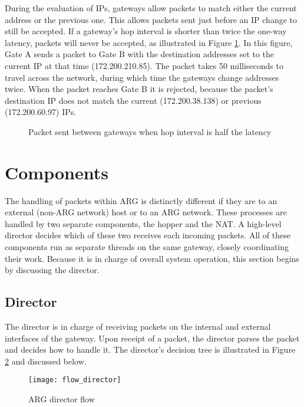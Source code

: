 \par During the evaluation of \acp{IP}, gateways allow packets to match either the current address or the previous one. This allows packets sent just before an \ac{IP} change to still be accepted. If a gateway's hop interval is shorter than twice the one-way latency, packets will never be accepted, as illustrated in Figure \ref{fig:late_packet_example}. In this figure, Gate A sends a packet to Gate B with the destination addresses set to the current \ac{IP} at that time (172.200.210.85). The packet takes 50 milliseconds to travel across the network, during which time the gateways change addresses twice. When the packet reaches Gate B it is rejected, because the packet's destination \ac{IP} does not match the current (172.200.38.138) or previous (172.200.60.97) \acp{IP}.

\begin{figure}
\caption{Packet sent between gateways when hop interval is half the latency}
\label{fig:late_packet_example}
\centering
\noindent{}
\end{figure}

\section{Components}
\label{sec:arg_components}
The handling of packets within ARG is distinctly different if they are to an external (non-ARG network) host or to an ARG network. These processes are handled by two separate components, the hopper and the NAT. A high-level director decides which of these two receives each incoming packets. All of these components run as separate threads on the same gateway, closely coordinating their work. Because it is in charge of overall system operation, this section begins by discussing the director.

\subsection{Director}
\label{sec:arg_director}
\par The director is in charge of receiving packets on the internal and external interfaces of the gateway. Upon receipt of a packet, the director parses the packet and decides how to handle it. The director's decision tree is illustrated in Figure \ref{fig:arg_director_flow} and discussed below.

\begin{figure}
\caption{\ac{ARG} director flow}
\label{fig:arg_director_flow}
\centering
\texttt{[image: flow\_director]}
\end{figure}

